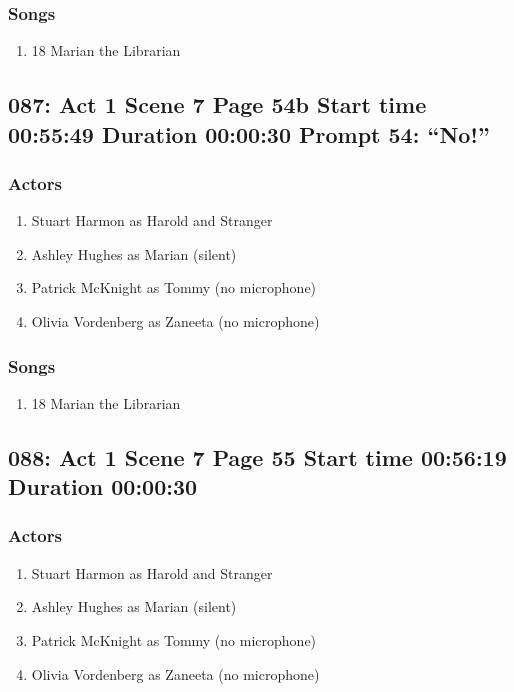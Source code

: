 \subsubsection{Songs}
\begin{enumerate}
\item 18 Marian the Librarian
\end{enumerate}
\subsection{087: Act 1 Scene 7 Page 54b Start time 00:55:49 Duration 00:00:30 Prompt 54: ``No!''}

\subsubsection{Actors}
\begin{enumerate}
\item Stuart Harmon as Harold and Stranger
\item Ashley Hughes as Marian (silent)
\item Patrick McKnight as Tommy (no microphone)
\item Olivia Vordenberg as Zaneeta (no microphone)
\end{enumerate}

\subsubsection{Songs}
\begin{enumerate}
\item 18 Marian the Librarian
\end{enumerate}
\subsection{088: Act 1 Scene 7 Page 55 Start time 00:56:19 Duration 00:00:30}

\subsubsection{Actors}
\begin{enumerate}
\item Stuart Harmon as Harold and Stranger
\item Ashley Hughes as Marian (silent)
\item Patrick McKnight as Tommy (no microphone)
\item Olivia Vordenberg as Zaneeta (no microphone)
\end{enumerate}

